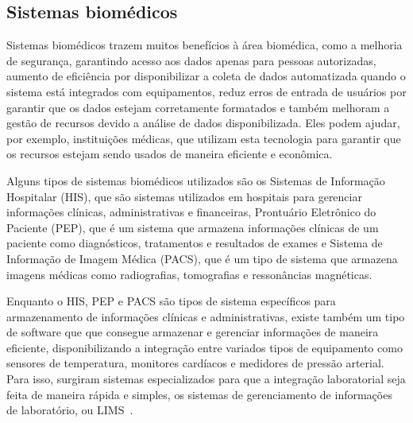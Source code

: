 \subsection{Sistemas biomédicos}

Sistemas biomédicos trazem muitos benefícios à área biomédica, como a melhoria de segurança, garantindo acesso aos dados apenas para pessoas autorizadas, aumento de eficiência por disponibilizar a coleta de dados automatizada quando o sistema está integrados com equipamentos, reduz erros de entrada de usuários por garantir que os dados estejam corretamente formatados e também melhoram a gestão de recursos devido a análise de dados disponibilizada. Eles podem ajudar, por exemplo, instituições médicas, que utilizam esta tecnologia para garantir que os recursos estejam sendo usados de maneira eficiente e econômica.

Alguns tipos de sistemas biomédicos utilizados são os Sistemas de Informação Hospitalar (HIS), que são sistemas utilizados em hospitais para gerenciar informações clínicas, administrativas e financeiras, Prontuário Eletrônico do Paciente (PEP), que é um sistema que armazena informações clínicas de um paciente como diagnósticos, tratamentos e resultados de exames e Sistema de Informação de Imagem Médica (PACS), que é um tipo de sistema que armazena imagens médicas como radiografias, tomografias e ressonâncias magnéticas.

Enquanto o HIS, PEP e PACS são tipos de sistema específicos para armazenamento de informações clínicas e administrativas, existe também um tipo de software que que consegue armazenar e gerenciar informações de maneira eficiente, disponibilizando a integração entre variados tipos de equipamento como sensores de temperatura, monitores cardíacos e medidores de pressão arterial. Para isso, surgiram sistemas especializados para que a integração laboratorial seja feita de maneira rápida e simples, os sistemas de gerenciamento de informações de laboratório, ou LIMS~\cite{Skobelev2011LaboratoryLaboratory}.






